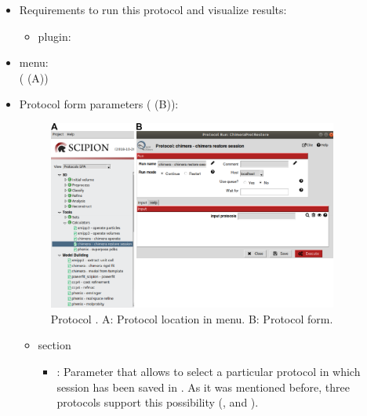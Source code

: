  \begin{itemize}
  \item Requirements to run this protocol and visualize results:
    \begin{itemize}
        \item \scipion plugin: 
    \end{itemize}
  \item \scipion menu:\\
    ( (A))\\
  
  \item Protocol form parameters ( (B)):\\
  
    \begin{figure}[H]
     \centering 
     \captionsetup{width=.7\linewidth} 
     \includegraphics[width=0.90\textwidth]{Images_appendix/Fig118.pdf}
     \caption{Protocol . A: Protocol location in \scipion menu. B: Protocol form.}
     \label{fig:app_protocol_chimera_3}
    \end{figure}
    
    \begin{itemize}
     \item {} section\\

    \begin{itemize}
     \item {}: Parameter that allows to select a particular protocol in which \chimera session has been saved in \scipion. As it was mentioned before, three protocols support this possibility (\chimera {}, \chimera {} and \chimera {}).\\
     

\end{itemize}
\end{itemize}
\end{itemize}
